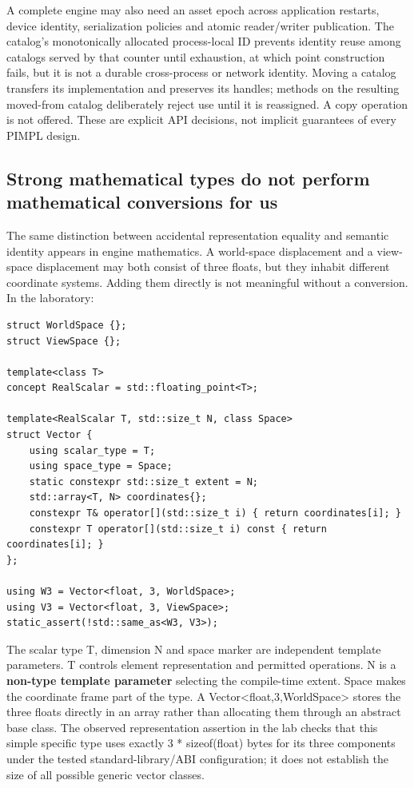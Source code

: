 A complete engine may also need an asset epoch across application restarts, device identity, serialization policies and atomic reader/writer publication. The catalog's monotonically allocated process-local ID prevents identity reuse among catalogs served by that counter until exhaustion, at which point construction fails, but it is not a durable cross-process or network identity. Moving a catalog transfers its implementation and preserves its handles; methods on the resulting moved-from catalog deliberately reject use until it is reassigned. A copy operation is not offered. These are explicit API decisions, not implicit guarantees of every PIMPL design.

\subsection{Strong mathematical types do not perform mathematical conversions for us}\label{01-foundations-i-ch007-strong-mathematical-types-do-not-perform-mathematical-conversions-for-us}

The same distinction between accidental representation equality and semantic identity appears in engine mathematics. A world-space displacement and a view-space displacement may both consist of three floats, but they inhabit different coordinate systems. Adding them directly is not meaningful without a conversion. In the laboratory:

\begin{verbatim}
struct WorldSpace {};
struct ViewSpace {};

template<class T>
concept RealScalar = std::floating_point<T>;

template<RealScalar T, std::size_t N, class Space>
struct Vector {
    using scalar_type = T;
    using space_type = Space;
    static constexpr std::size_t extent = N;
    std::array<T, N> coordinates{};
    constexpr T& operator[](std::size_t i) { return coordinates[i]; }
    constexpr T operator[](std::size_t i) const { return coordinates[i]; }
};

using W3 = Vector<float, 3, WorldSpace>;
using V3 = Vector<float, 3, ViewSpace>;
static_assert(!std::same_as<W3, V3>);
\end{verbatim}

The scalar type T, dimension N and space marker are independent template parameters. T controls element representation and permitted operations. N is a \textbf{non-type template parameter} selecting the compile-time extent. Space makes the coordinate frame part of the type. A Vector\textless float,3,WorldSpace\textgreater{} stores the three floats directly in an array rather than allocating them through an abstract base class. The observed representation assertion in the lab checks that this simple specific type uses exactly 3 * sizeof(float) bytes for its three components under the tested standard-library/ABI configuration; it does not establish the size of all possible generic vector classes.

